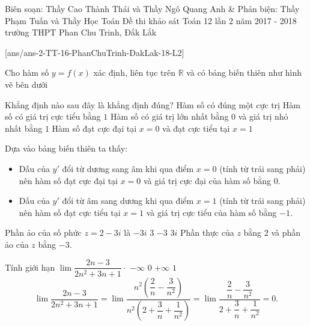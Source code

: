 \begin{name}
{Biên soạn: Thầy Cao Thành Thái và Thầy Ngô Quang Anh \& Phản biện: Thầy Phạm Tuấn và Thầy Học Toán}
{Đề thi khảo sát Toán 12 lần 2 năm 2017 - 2018 trường THPT Phan Chu Trinh, Đắk Lắk}
\end{name}
\setcounter{ex}{0}\setcounter{bt}{0}
[ans/ans-2-TT-16-PhanChuTrinh-DakLak-18-L2]


\begin{ex}%
 Cho hàm số $y = f(x)$ xác định, liên tục trên $\mathbb{R}$ và có bảng biến thiên như hình vẽ bên dưới
 \begin{center}
 \end{center}
 Khẳng định nào sau đây là khẳng định đúng?
 \choice
  {Hàm số có đúng một cực trị}
  {Hàm số có giá trị cực tiểu bằng $1$}
  {Hàm số có giá trị lớn nhất bằng $0$ và giá trị nhỏ nhất bằng $1$}
  {\True Hàm số đạt cực đại tại $x = 0$ và đạt cực tiểu tại $x = 1$}
 \loigiai
  {
  Dựa vào bảng biến thiên ta thấy:
  \begin{itemize}
   \item Dấu của $y'$ đổi từ dương sang âm khi qua điểm $x = 0$ (tính từ trái sang phải) nên hàm số đạt cực đại tại $x = 0$ và giá trị cực đại của hàm số bằng $0$.
   \item Dấu của $y'$ đổi từ âm sang dương khi qua điểm $x = 1$ (tính từ trái sang phải) nên hàm số đạt cực tiểu tại $x = 1$ và giá trị cực tiểu của hàm số bằng $-1$.
  \end{itemize}
  }
\end{ex}


\begin{ex}%
 Phần ảo của số phức $z = 2 - 3i$ là
 \choice
  {$-3i$}
  {$3$}
  {\True $-3$}
  {$3i$}
 \loigiai
  {
  Phần thực của $z$ bằng $2$ và phần ảo của $z$ bằng $-3$.
  }
\end{ex}


\begin{ex}%
 Tính giới hạn $\lim \dfrac{2n - 3}{2n^2 + 3n + 1} \cdot$
 \choice
  {$- \infty$}
  {\True $0$}
  {$+ \infty$}
  {$1$}
 \loigiai
  {
  $$\lim \dfrac{2n - 3}{2n^2 + 3n + 1} = \lim \dfrac{n^2 \left( \dfrac{2}{n} - \dfrac{3}{n^2} \right)}{n^2 \left( 2 + \dfrac{3}{n} + \dfrac{1}{n^2} \right)} = \lim \dfrac{\dfrac{2}{n} - \dfrac{3}{n^2}}{2 + \dfrac{3}{n} + \dfrac{1}{n^2}} = 0.$$
  }
\end{ex}


